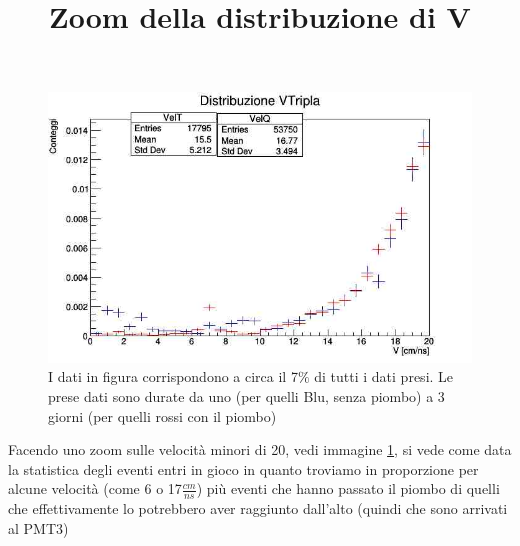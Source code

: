 \documentclass[a4paper]{article}
\begin{document}
\begin{figure}
\centering
\title{Zoom della distribuzione di V}
\begin{center}
\includegraphics[scale=0.3]{./immagini/TimeOFFlight/ZoomVel.jpg}
\caption{I dati in figura corrispondono a circa il 7$\%$ di tutti i dati presi. Le prese dati sono durate da uno (per quelli Blu, senza piombo) a 3 giorni (per quelli rossi con il piombo)}
\label{fig:ZoomV}
\end{center}
\end{figure}

Facendo uno zoom sulle velocità minori di 20, vedi immagine \ref{fig:ZoomV}, si vede come data la statistica degli eventi entri in gioco in quanto troviamo in proporzione per alcune velocità (come 6 o 17$\frac{cm}{ns}$) più eventi che hanno passato il piombo di quelli che effettivamente lo potrebbero aver raggiunto dall'alto (quindi che sono arrivati al PMT3)
\end{document}

